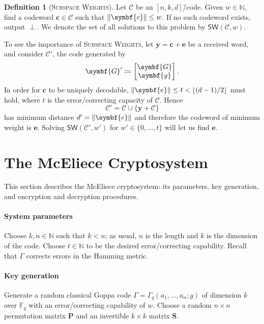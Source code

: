 \documentclass[version=last, paper=A4, parskip=half, oneside,%
toc=bibliography, toc=listof, listof=leveldown]{scrbook}
\theoremstyle{plain}
\theoremstyle{definition}
\newtheorem{definition}{Definition}
\theoremstyle{remark}
\renewcommand*{\vec}{\symbf}
\newcommand*{\mat}{\symbf}
\newcommand*{\FF}{\ensuremath{\mathbb{F}}}
\newcommand*{\NN}{\ensuremath{\mathbb{N}}}
\newcommand*{\Gop}{\ensuremath{\Gamma}}
\newcommand*{\SW}{\ensuremath{\mathsf{SW}}}
\DeclarePairedDelimiter{\floor}{\lfloor}{\rfloor}
\DeclarePairedDelimiter{\norm}{\lVert}{\rVert}
\begin{document}
\begin{definition}[\textsc{Subspace Weights}]
  Let \(\mathcal{C}\) be an \([n, k, d]\)\=/code.  Given \(w \in \NN\), find a
  codeword \(\vec{c} \in \mathcal{C}\) such that \(\norm{\vec{c}} \le w\).  If
  no such codeword exists, output \(\perp\).  We denote the set of all solutions
  to this problem by \(\SW(\mathcal{C}, w)\).
\end{definition}

To see the importance of \textsc{Subspace Weights}, let
\(\vec{y} = \vec{c} + \vec{e}\) be a received word, and consider
\(\mathcal{C}'\), the code generated by
\[
  \mat{G}' \coloneqq \begin{bmatrix} \mat{G} \\ \vec{y} \end{bmatrix}\text.
\]
In order for \(\vec{c}\) to be uniquely decodable,
\(\norm{\vec{e}} \le t < \floor{(d - 1) / {2}}\) must hold, where \(t\) is the
error\-/correcting capacity of \(\mathcal{C}\).  Hence
\[
  \mathcal{C}' = \mathcal{C} \cup \{\vec{y} + \mathcal{C}\}
\]
has minimum distance \(d' = \norm{\vec{e}}\) and therefore the codeword of
minimum weight is \(\vec{e}\).  Solving \(\SW(\mathcal{C}', w')\) for
\(w' \in \{0, \ldots, t\}\) will let us find \(\vec{e}\).

\section{The McEliece Cryptosystem}

This section describes the McEliece cryptosystem: its parameters, key
generation, and encryption and decryption procedures.

\paragraph{System parameters} Choose \(k, n \in \NN\) such that \(k < n\); as
usual, \(n\) is the length and \(k\) is the dimension of the code.  Choose
\(t \in \NN\) to be the desired error\-/correcting capability.  Recall that
\(\Gop\) corrects errors in the Hamming metric.

\paragraph{Key generation} Generate a random classical Goppa code
\(\Gop = \Gop_q(a_1, \ldots, a_n; g)\) of dimension \(k\) over \(\FF_q\) with
an error\-/correcting capability of \(w\).  Choose a random \(n \times n\)
permutation matrix \(\mat{P}\) and an invertible \(k \times k\) matrix
\(\mat{S}\).
\end{document}
